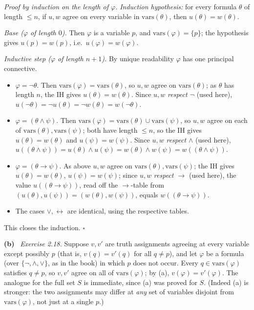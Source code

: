 \documentclass[11pt]{article}
\newcommand{\vars}{\mathrm{vars}}
\newcommand{\solpart}[1]{\smallskip\noindent\textbf{(#1)}\ }
\begin{document}
\emph{Proof by induction on the length of $\varphi$.}
\emph{Induction hypothesis:} for every formula $\theta$ of length $\le n$, if $u,w$
agree on every variable in $\vars(\theta)$, then $u(\theta)=w(\theta)$.

\emph{Base ($\varphi$ of length $0$).} Then $\varphi$ is a variable $p$, and
$\vars(\varphi)=\{p\}$; the hypothesis gives $u(p)=w(p)$, i.e.\ $u(\varphi)=
w(\varphi)$.

\emph{Inductive step ($\varphi$ of length $n+1$).} By unique readability $\varphi$
has one principal connective.
\begin{itemize}[nosep]
\item $\varphi=\lnot\theta$. Then $\vars(\varphi)=\vars(\theta)$, so $u,w$ agree on
$\vars(\theta)$; as $\theta$ has length $n$, the IH gives $u(\theta)=w(\theta)$.
Since $u,w$ \emph{respect $\lnot$} (used here),
$u(\lnot\theta)=\lnot u(\theta)=\lnot w(\theta)=w(\lnot\theta)$.
\item $\varphi=(\theta\land\psi)$. Then $\vars(\varphi)=\vars(\theta)\cup
\vars(\psi)$, so $u,w$ agree on each of $\vars(\theta),\vars(\psi)$; both have
length $\le n$, so the IH gives $u(\theta)=w(\theta)$ and $u(\psi)=w(\psi)$. Since
$u,w$ \emph{respect $\land$} (used here), $u((\theta\land\psi))=u(\theta)\land
u(\psi)=w(\theta)\land w(\psi)=w((\theta\land\psi))$.
\item $\varphi=(\theta\to\psi)$. As above $u,w$ agree on $\vars(\theta),
\vars(\psi)$; the IH gives $u(\theta)=w(\theta)$, $u(\psi)=w(\psi)$; since $u,w$
\emph{respect $\to$} (used here), the value $u((\theta\to\psi))$, read off the
$\to$-table from $(u(\theta),u(\psi))=(w(\theta),w(\psi))$, equals
$w((\theta\to\psi))$.
\item The cases $\lor,\leftrightarrow$ are identical, using the respective tables.
\end{itemize}
This closes the induction. \hfill$\square$

\solpart{b} \emph{Exercise 2.18.} Suppose $v,v'$ are truth assignments agreeing at
every variable except possibly $p$ (that is, $v(q)=v'(q)$ for all $q\neq p$), and
let $\varphi$ be a formula (over $\{\lnot,\land,\lor\}$, as in the book) in which
$p$ does not occur. Every $q\in\vars(\varphi)$ satisfies $q\neq p$, so $v,v'$ agree
on all of $\vars(\varphi)$; by (a), $v(\varphi)=v'(\varphi)$. The analogue for the
full set $S$ is immediate, since (a) was proved for $S$. (Indeed (a) is stronger:
the two assignments may differ at \emph{any} set of variables disjoint from
$\vars(\varphi)$, not just at a single $p$.)
\end{document}
